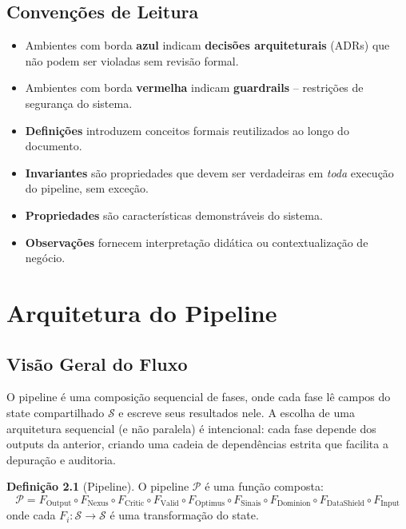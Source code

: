\documentclass[a4paper, 12pt]{report}
\theoremstyle{definition}
\newtheorem{definicao}{Defini\c{c}\~ao}[chapter]
\theoremstyle{remark}
\newcommand{\state}{\mathcal{S}}
\begin{document}
\section{Conven\c{c}\~oes de Leitura}

\begin{itemize}
  \item Ambientes com borda \textcolor{blue!50!black}{\textbf{azul}}
    indicam \textbf{decis\~oes arquiteturais} (ADRs) que n\~ao podem ser
    violadas sem revis\~ao formal.
  \item Ambientes com borda \textcolor{red!50!black}{\textbf{vermelha}}
    indicam \textbf{guardrails} -- restri\c{c}\~oes de seguran\c{c}a do sistema.
  \item \textbf{Defini\c{c}\~oes} introduzem conceitos formais reutilizados
    ao longo do documento.
  \item \textbf{Invariantes} s\~ao propriedades que devem ser verdadeiras
    em \textit{toda} execu\c{c}\~ao do pipeline, sem exce\c{c}\~ao.
  \item \textbf{Propriedades} s\~ao caracter\'isticas demonstr\'aveis do sistema.
  \item \textbf{Observa\c{c}\~oes} fornecem interpreta\c{c}\~ao did\'atica ou
    contextualiza\c{c}\~ao de neg\'ocio.
\end{itemize}


\chapter{Arquitetura do Pipeline}

\section{Vis\~ao Geral do Fluxo}

O pipeline \'e uma composi\c{c}\~ao sequencial de fases, onde cada fase
l\^e campos do state compartilhado $\state$ e escreve seus resultados
nele. A escolha de uma arquitetura sequencial (e n\~ao paralela) \'e
intencional: cada fase depende dos outputs da anterior, criando uma
cadeia de depend\^encias estrita que facilita a depura\c{c}\~ao e auditoria.

\begin{definicao}[Pipeline]
  O pipeline $\mathcal{P}$ \'e uma fun\c{c}\~ao composta:
  \[
    \mathcal{P} = F_{\text{Output}} \circ F_{\text{Nexus}} \circ
    F_{\text{Critic}} \circ F_{\text{Valid}} \circ F_{\text{Optimus}}
    \circ F_{\text{Sinais}} \circ F_{\text{Dominion}} \circ
    F_{\text{DataShield}} \circ F_{\text{Input}}
  \]
  onde cada $F_i : \state \to \state$ \'e uma transforma\c{c}\~ao do state.
\end{definicao}
\end{document}
